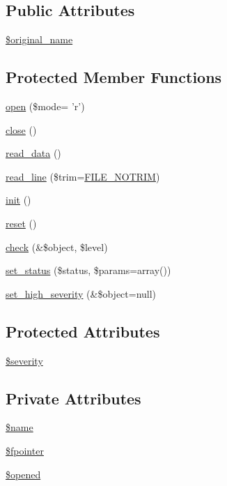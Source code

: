 \subsection*{Public Attributes}
\begin{DoxyCompactItemize}
\item 
\hyperlink{classFileHandler_a477708585850c3c8725ccf56bfe0b4a8}{\$original\_\-name}
\end{DoxyCompactItemize}
\subsection*{Protected Member Functions}
\begin{DoxyCompactItemize}
\item 
\hyperlink{classFileHandler_a2a650b033c4eb1f98ba47fb05ce7b454}{open} (\$mode= 'r')
\item 
\hyperlink{classFileHandler_aa48e7c3b67346e29b194d2f0ac5dd1f8}{close} ()
\item 
\hyperlink{classFileHandler_a1389a6ea19a22471c301d70b5ed68ed8}{read\_\-data} ()
\item 
\hyperlink{classFileHandler_a69f84a8138f717c84f560125f1f95448}{read\_\-line} (\$trim=\hyperlink{class_8filehandler_8php_a3720f2e15eb9e16e29d8ecbb96763662}{FILE\_\-NOTRIM})
\item 
\hyperlink{class__OWL_ae0ef3ded56e8a6b34b6461e5a721cd3e}{init} ()
\item 
\hyperlink{class__OWL_a2f2a042bcf31965194c03033df0edc9b}{reset} ()
\item 
\hyperlink{class__OWL_ad6f4f6946f40199dd0333cf219fa500e}{check} (\&\$object, \$level)
\item 
\hyperlink{class__OWL_aea912d0ede9b3c2a69b79072d94d4787}{set\_\-status} (\$status, \$params=array())
\item 
\hyperlink{class__OWL_a576829692a3b66e3d518853bf43abae3}{set\_\-high\_\-severity} (\&\$object=null)
\end{DoxyCompactItemize}
\subsection*{Protected Attributes}
\begin{DoxyCompactItemize}
\item 
\hyperlink{class__OWL_ad26b40a9dbbacb33e299b17826f8327c}{\$severity}
\end{DoxyCompactItemize}
\subsection*{Private Attributes}
\begin{DoxyCompactItemize}
\item 
\hyperlink{classFileHandler_a94903bd51b241928ed415ad271c38805}{\$name}
\item 
\hyperlink{classFileHandler_aa0aa66fd3ad551b3f508b901a95c0c2d}{\$fpointer}
\item 
\hyperlink{classFileHandler_a061409b2bbd2e13bc47415527c0de720}{\$opened}
\end{DoxyCompactItemize}


